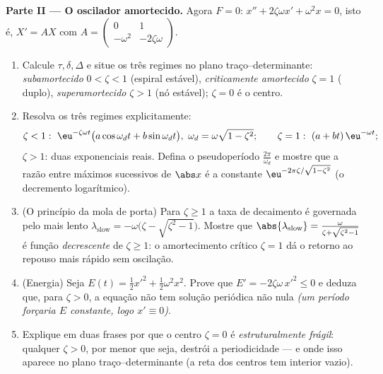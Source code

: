 \begin{problem}
\medskip
\noindent\textbf{Parte II --- O oscilador amortecido.} Agora $F =
0$: $x'' + 2\zeta\omega x' + \omega^2x = 0$, isto é, $X' = AX$
com $A = \begin{pmatrix} 0 & 1\\ -\omega^2 &
-2\zeta\omega\end{pmatrix}$.
\begin{enumerate}[resume]
  \item Calcule $\tau, \delta, \Delta$ e situe os três
        regimes no plano traço--determinante:
        \emph{subamortecido} $0 < \zeta < 1$ (espiral estável),
        \emph{criticamente amortecido} $\zeta = 1$ (
        duplo), \emph{superamortecido} $\zeta > 1$ (nó
        estável); $\zeta = 0$ é o centro.
  \item Resolva os três regimes explicitamente:
        \[
        \zeta < 1:\ \eu^{-\zeta\omega t}\bigl(a\cos\omega_d t
        + b\sin\omega_dt\bigr),\ \omega_d =
        \omega\sqrt{1-\zeta^2};
        \qquad
        \zeta = 1:\ (a + bt)\,\eu^{-\omega t};
        \]
        $\zeta > 1$: duas exponenciais reais. Defina o
        pseudoperíodo $\frac{2\pi}{\omega_d}$ e mostre que
        a razão entre máximos sucessivos de $\abs x$ é a
        constante $\eu^{-2\pi\zeta/\sqrt{1-\zeta^2}}$ (o
        decremento logarítmico).
  \item (O princípio da mola de porta) Para $\zeta \geq 1$ a
        taxa de decaimento é governada pelo  mais lento
        $\lambda_{\mathrm{slow}} = -\omega\bigl(\zeta -
        \sqrt{\zeta^2-1}\bigr)$. Mostre que
        $\abs{\lambda_{\mathrm{slow}}} =
        \frac{\omega}{\zeta + \sqrt{\zeta^2 - 1}}$ é função
        \emph{decrescente} de $\zeta \geq 1$:
        o amortecimento crítico $\zeta = 1$ dá o retorno ao
        repouso mais rápido sem oscilação.
  \item (Energia) Seja $E(t) = \frac12x'^2 +
        \frac12\omega^2x^2$. Prove que $E' = -2\zeta\omega\,x'^2
        \leq 0$ e deduza que, para $\zeta > 0$, a equação
        não tem solução periódica não nula \emph{(um período
        forçaria $E$ constante, logo $x' \equiv 0$)}.
  \item Explique em duas frases por que o centro $\zeta = 0$
        é \emph{estruturalmente frágil}: qualquer $\zeta > 0$,
        por menor que seja, destrói a periodicidade --- e onde
        isso aparece no plano traço--determinante (a reta dos
        centros tem interior vazio).
\end{enumerate}


\end{problem}
